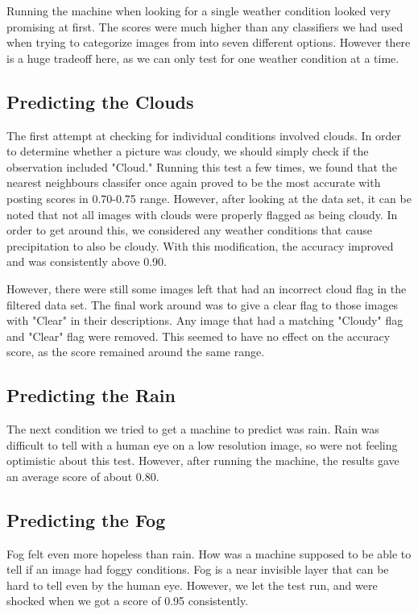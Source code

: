 Running the machine when looking for a single weather condition looked very promising at first. The scores were much higher than any classifiers we had used when trying to categorize images from into seven different options. However there is a huge tradeoff here, as we can only test for one weather condition at a time.

\subsection{Predicting the Clouds}

The first attempt at checking for individual conditions involved clouds. In order to determine whether a picture was cloudy, we should simply check if the observation included "Cloud." Running this test a few times, we found that the nearest neighbours classifer once again proved to be the most accurate with posting scores in 0.70-0.75 range. However, after looking at the data set, it can be noted that not all images with clouds were properly flagged as being cloudy. In order to get around this, we considered any weather conditions that cause precipitation to also be cloudy. With this modification, the accuracy improved and was consistently above 0.90.

However, there were still some images left that had an incorrect cloud flag in the filtered data set. The final work around was to give a clear flag to those images with "Clear" in their descriptions. Any image that had a matching "Cloudy" flag and "Clear" flag were removed. This seemed to have no effect on the accuracy score, as the score remained around the same range.

\subsection{Predicting the Rain}

The next condition we tried to get a machine to predict was rain. Rain was difficult to tell with a human eye on a low resolution image, so were not feeling optimistic about this test. However, after running the machine, the results gave an average score of about 0.80.

\subsection{Predicting the Fog}

Fog felt even more hopeless than rain. How was a machine supposed to be able to tell if an image had foggy conditions. Fog is a near invisible layer that can be hard to tell even by the human eye. However, we let the test run, and were shocked when we got a score of 0.95 consistently.


